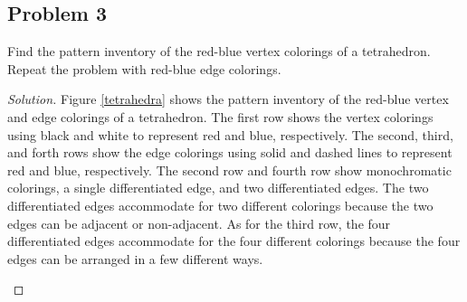 \documentclass[12pt]{amsart}
\newenvironment{solution}
{\begin{proof}[Solution]}
{\end{proof}}
\begin{document}
\begin{onehalfspace}
        \section{Problem 3}
        Find the pattern inventory of the red-blue vertex colorings of a tetrahedron.
        Repeat the problem with red-blue edge colorings.

        \begin{solution}
        Figure \ref{tetrahedra} shows the pattern inventory of the red-blue vertex and edge colorings of a tetrahedron.
        The first row shows the vertex colorings using black and white to represent red and blue, respectively.
        The second, third, and forth rows show the edge colorings using solid and dashed lines to represent red and blue, respectively.
        The second row and fourth row show monochromatic colorings, a single differentiated edge, and two differentiated
        edges.
        The two differentiated edges accommodate for two different colorings because the two edges can be adjacent or non-adjacent.
        As for the third row, the four differentiated edges accommodate for the four different colorings because the four edges can be arranged in a few different ways.
        \begin{figure}
\end{figure}
\end{solution}
\end{onehalfspace}
\end{document}
